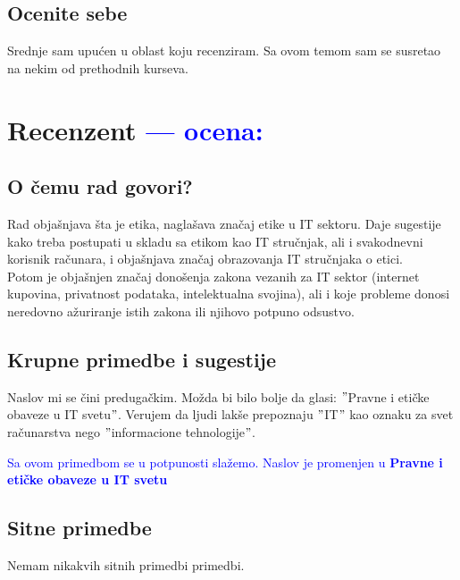 \documentclass[a4paper]{report}
\newcommand{\odgovor}[1]{\textcolor{blue}{#1}}
\begin{document}
\section{Ocenite sebe}
Srednje sam upućen u oblast koju recenziram. Sa ovom temom sam se susretao na nekim od prethodnih kurseva.

\chapter{Recenzent \odgovor{--- ocena:} }

\section{O čemu rad govori?}
Rad objašnjava šta je etika, naglašava značaj etike u IT sektoru. Daje sugestije kako treba postupati u skladu sa etikom kao IT stručnjak, ali i svakodnevni korisnik računara, i objašnjava značaj obrazovanja IT stručnjaka o etici.\\
Potom je objašnjen značaj donošenja zakona vezanih za IT sektor (internet kupovina, privatnost podataka, intelektualna svojina), ali i koje probleme donosi neredovno ažuriranje istih zakona ili njihovo potpuno odsustvo.

\section{Krupne primedbe i sugestije}
Naslov mi se čini predugačkim. Možda bi bilo bolje da glasi: $"$Pravne i etičke obaveze u IT svetu$"$. Verujem da ljudi lakše prepoznaju $"$IT$"$ kao oznaku za svet računarstva nego $"$informacione tehnologije$"$.

\odgovor{Sa ovom primedbom se u potpunosti slažemo. Naslov je promenjen u \textbf{Pravne i etičke obaveze u IT svetu}}

\section{Sitne primedbe}
Nemam nikakvih sitnih primedbi primedbi.
\end{document}
